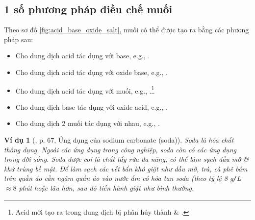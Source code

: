 \documentclass{article}
\newtheorem{vidu}{Ví dụ}
\begin{document}
\subsection{1 số phương pháp điều chế muối}
Theo sơ đồ \ref{fig:acid_base_oxide_salt}, muối có thể được tạo ra bằng các phương pháp sau:
\begin{itemize}
	\item Cho dung dịch acid tác dụng với base, e.g., .
	\item Cho dung dịch acid tác dụng với oxide base, e.g., .
	\item Cho dung dịch acid tác dụng với muối, e.g., .\footnote{Acid  mới tạo ra trong dung dịch bị phân hủy thành  \& .}
	\item Cho dung dịch base tác dụng với oxide acid, e.g., .
	\item Cho dung dịch 2 muối tác dụng với nhau, e.g., .
\end{itemize}

\begin{vidu}[\cite{SGK_KHTN_8_Canh_Dieu},  p. 67, Ứng dụng của sodium carbonate (soda)]
	Soda là hóa chất thông dụng. Ngoài các ứng dụng trong công nghiệp, soda còn có các ứng dụng trong đời sống. Soda được coi là chất tẩy rửa đa năng, có thể làm sạch dầu mỡ \& khử trùng bề mặt. Để làm sạch các vết bẩn khó giặt như dầu mỡ, trà, cà phê bám trên quần áo cần ngâm quần áo vào nước ấm có hòa tan soda (theo tỷ lệ {\rm8 g{\tt/}L} $\approx8$ phút hoặc lâu hơn, sau đó tiến hành giặt như bình thường.
\end{vidu}
\noindent{}
\end{document}
